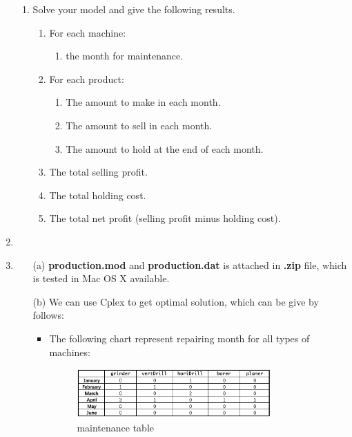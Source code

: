 \documentclass[12pt,a4paper]{article}
\makeatletter
\newtheorem*{solution}{Solution}
\theoremstyle{definition}
\renewenvironment{solution}[1][Solution] {\par\pushQED{\qed}\normalfont\topsep6\p@\@plus6\p@\relax\trivlist\item[\hskip\labelsep\bfseries#1\@addpunct{.}]\ignorespaces}{\popQED\endtrivlist\@endpefalse} \makeatother
\makeatother
\begin{document}
\begin{enumerate}
\begin{enumerate}
    \item
    Solve your model and give the following results.
    \begin{enumerate}
    \item
    For each machine:
    \begin{enumerate}
    \item
    the month for maintenance.
    \end{enumerate}
    \item
    For each product:
    \begin{enumerate}
    \item
    The amount to make in each month.
    \item
    The amount to sell in each month.
    \item
    The amount to hold at the end of each month.
    \end{enumerate}
    \item
    The total selling profit.
    \item
    The total holding cost.
    \item
    The total net profit (selling profit minus holding cost).
    \end{enumerate}
    \end{enumerate}
    \begin{solution}\item
        \renewcommand{\qedsymbol}{}
        \begin{itemize}
          \item [(a)] \textbf{production.mod} and \textbf{production.dat} is attached in \textbf{.zip} file, which is tested in Mac OS X available.
          \item [(b)] We can use Cplex to get optimal solution, which can be give by follows:
          \begin{itemize}
            \item The following chart represent repairing month for all types of machines:
                \begin{figure}[htbp]
                \centering
                \includegraphics[width=0.8\textwidth]{figures/1_3.png}
                \caption{maintenance table}\label{PNG2}
                \end{figure}

\end{itemize}
\end{itemize}
\end{solution}
\end{enumerate}
\end{document}
